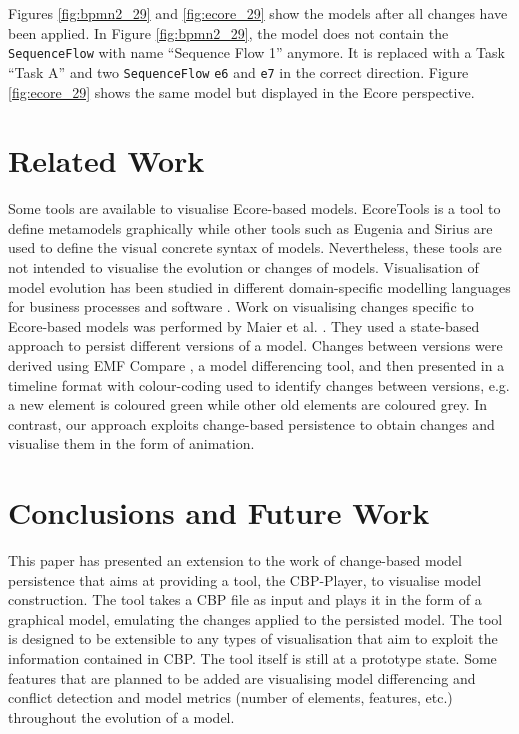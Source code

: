 \documentclass[conference]{IEEEtran}
\begin{document}
Figures \ref{fig:bpmn2_29} and \ref{fig:ecore_29} show the models after all changes have been applied. In Figure \ref{fig:bpmn2_29}, the model does not contain the \texttt{SequenceFlow} with name ``Sequence Flow 1'' anymore. It is replaced with a Task ``Task A'' and two \texttt{SequenceFlow} \texttt{e6} and \texttt{e7} in the correct direction. Figure \ref{fig:ecore_29} shows the same model but displayed in the Ecore perspective. 

\section{Related Work}
\label{sec:related_work}
Some tools are available to visualise Ecore-based models. 
EcoreTools \cite{eclipse2019ecoretools} is a tool to define metamodels graphically while other tools such as
Eugenia \cite{Kolovos2017} and Sirius \cite{eclipse2019sirius} are used 
to define the visual concrete syntax of models.
Nevertheless, these tools are not intended to visualise the evolution or changes of models. 
Visualisation of model evolution has been studied in different domain-specific
modelling languages for business processes \cite{fritscher2014visualizing}
and software \cite{Mattila:2016:SVT:2994310.2994327}. Work on visualising changes specific to Ecore-based models 
was performed by Maier et al. \cite{maier2015recording}. 
They used a state-based approach to persist different versions of a model.
Changes between versions were derived using EMF Compare \cite{eclipse2017compare}, 
a model differencing tool, and then presented 
in a timeline format with colour-coding used 
to identify changes between versions, e.g. a new element is coloured green
while other old elements are coloured grey. In contrast, our approach
exploits change-based persistence to obtain changes and visualise them in
the form of animation.

\section{Conclusions and Future Work}
\label{sec:conclusions_and_future_work}
This paper has presented an extension to the work of change-based model persistence
that aims at providing a tool, the CBP-Player, to visualise model construction. 
The tool takes a CBP file as input and plays it in the form of a graphical model,
emulating the changes applied to the persisted model. 
The tool is designed to be extensible to any types of visualisation that aim
to exploit the information contained in CBP. The tool itself is still at a prototype state. 
Some features that are planned to be added are visualising model differencing
and conflict detection and model metrics 
(number of elements, features, etc.) throughout the evolution of a model.
\end{document}
